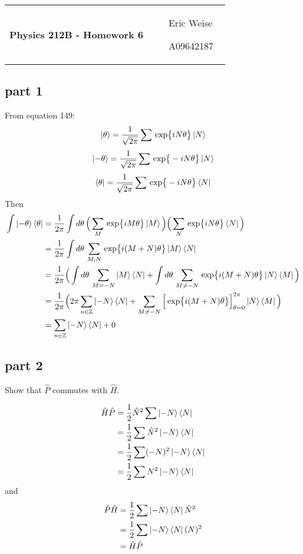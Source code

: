 \documentclass{article}
\newcommand{\assignment}[1]{
    \newpage
    \begin{tabular}{p{0.65\linewidth}p{0.25\linewidth}}
        {\bf\LARGE Physics 212B - Homework #1 }
        &
        \parbox[b]{0.24\textwidth}{
            \hfill Eric Weise

            \hfill A09642187
            }
    \end{tabular}
    \vspace{12pt}
    \newline
}
\newcommand{\D}[1]{{d#1 \,}}
\renewcommand{\exp}[1]{\,\text{exp} \big\{ #1 \big\} }
\begin{document}
\assignment{6}
\subsection*{part 1}
From equation 149:
\[ \ket{\theta} = \frac{1}{\sqrt{2\pi}} \sum \exp{iN\theta} \ket{N} \]
\[ \ket{-\theta} = \frac{1}{\sqrt{2\pi}} \sum \exp{-iN\theta} \ket{N} \]
\[ \bra{\theta} = \frac{1}{\sqrt{2\pi}} \sum \exp{-iN\theta} \bra{N} \]
Then
\begin{align*}
    \int \ket{-\theta}\bra{\theta}
    &= \frac{1}{2\pi} \int \D{\theta} \Big( \sum_M\exp{iM\theta}\ket{M} \Big) \Big( \sum_N \exp{iN\theta}\bra{N} \Big) \\
    &= \frac{1}{2\pi} \int \D{\theta} \sum_{M,N}\exp{i(M+N)\theta}\ket{M}\bra{N} \\
    &= \frac{1}{2\pi} \Big( \int \D{\theta} \sum_{M=-N}\ket{M}\bra{N} + \int \D{\theta} \sum_{M\neq-N} \exp{i(M+N)\theta}\ket{N}\bra{M} \Big) \\
    &= \frac{1}{2\pi} \Big( 2\pi \sum_{n\in\mathbb{Z}} \ket{-N}\bra{N} + \sum_{M\neq-N} \Big[ \exp{i(M+N)\theta}\Big]_{\theta=0}^{2\pi} \ket{N}\bra{M}  \Big) \\
    &= \sum_{n\in\mathbb{Z}} \ket{-N}\bra{N} + 0
\end{align*}

\subsection*{part 2}
Show that $\hat{P}$ commutes with $\hat{H}$.

\begin{align*}
    \hat{H}\hat{P}
    &= \frac{1}{2}\hat{N}^2\sum\ket{-N}\bra{N} \\
    &= \frac{1}{2} \sum \hat{N}^2\ket{-N}\bra{N} \\
    &= \frac{1}{2} \sum (-N)^2\ket{-N}\bra{N} \\
    &= \frac{1}{2} \sum N^2\ket{-N}\bra{N}
\end{align*}
and
\begin{align*}
    \hat{P}\hat{H}
    &= \frac{1}{2} \sum \ket{-N}\bra{N} \hat{N}^2 \\
    &= \frac{1}{2} \sum \ket{-N}\bra{N} (N)^2 \\
    &= \hat{H}\hat{P}
\end{align*}


\end{document}

